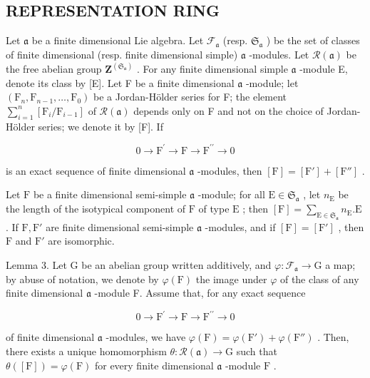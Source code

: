 \subsection{REPRESENTATION RING}

Let \(\mathfrak{a}\) be a finite dimensional Lie algebra. Let \(\mathcal{F}_{\mathfrak{a}}\) (resp. \(\mathfrak{S}_{\mathfrak{a}}\) ) be the set of classes of finite dimensional (resp. finite dimensional simple) \(\mathfrak{a}\) -modules. Let \(\mathcal{R}(\mathfrak{a})\) be the free abelian group \(\mathbf{Z}^{(\mathfrak{S}_{\mathfrak{a}})}\) . For any finite dimensional simple \(\mathfrak{a}\) -module E, denote its class by {[}E{]}. Let F be a finite dimensional \(\mathfrak{a}\) -module; let \((\mathrm{F}_n,\mathrm{F}_{n - 1},\dots ,\mathrm{F}_0)\) be a Jordan-Hölder series for F; the element \(\sum_{i = 1}^{n}[\mathrm{F}_i / \mathrm{F}_{i - 1}]\) of \(\mathcal{R}(\mathfrak{a})\) depends only on F and not on the choice of Jordan-Hölder series; we denote it by {[}F{]}. If

\[
0 \longrightarrow \mathrm{F} ^ {\prime} \longrightarrow \mathrm{F} \longrightarrow \mathrm{F} ^ {\prime \prime} \longrightarrow 0
\]

is an exact sequence of finite dimensional \(\mathfrak{a}\) -modules, then \([\mathrm{F}] = [\mathrm{F}'] + [\mathrm{F}'']\) .

Let \(\mathrm{F}\) be a finite dimensional semi-simple \(\mathfrak{a}\) -module; for all \(\mathrm{E} \in \mathfrak{S}_{\mathfrak{a}}\) , let \(n_{\mathrm{E}}\) be the length of the isotypical component of \(\mathrm{F}\) of type \(\mathrm{E}\) ; then \([\mathrm{F}] = \sum_{\mathrm{E} \in \mathfrak{S}_{\mathfrak{a}}} n_{\mathrm{E}}. \mathrm{E}\) . If \(\mathrm{F}, \mathrm{F}'\) are finite dimensional semi-simple \(\mathfrak{a}\) -modules, and if \([\mathrm{F}] = [\mathrm{F}']\) , then \(\mathrm{F}\) and \(\mathrm{F}'\) are isomorphic.

Lemma 3. Let G be an abelian group written additively, and \(\varphi : \mathcal{F}_{\mathfrak{a}} \to \mathrm{G}\) a map; by abuse of notation, we denote by \(\varphi(\mathrm{F})\) the image under \(\varphi\) of the class of any finite dimensional \(\mathfrak{a}\) -module F. Assume that, for any exact sequence

\[
0 \longrightarrow \mathrm{F} ^ {\prime} \longrightarrow \mathrm{F} \longrightarrow \mathrm{F} ^ {\prime \prime} \longrightarrow 0
\]

of finite dimensional \(\mathfrak{a}\) -modules, we have \(\varphi(\mathrm{F}) = \varphi(\mathrm{F}') + \varphi(\mathrm{F}'')\) . Then, there exists a unique homomorphism \(\theta: \mathcal{R}(\mathfrak{a}) \to \mathrm{G}\) such that \(\theta([\mathrm{F}]) = \varphi(\mathrm{F})\) for every finite dimensional \(\mathfrak{a}\) -module \(\mathrm{F}\) .

